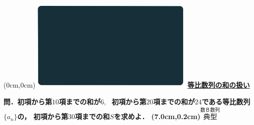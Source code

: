\documentclass[10pt,
fleqn,
dvipdfmx,
uplatex
]{jsarticle}
\begin{document}
\at(0cm,0cm){\includegraphics[width=8cm,bb=0 0 1920 1080]{./youtube/thumbnails/templates/smart_background/数B数列.jpeg}}
{\color{orange}\bf\boldmath\LARGE\underline{等比数列の和の扱い}}\vspace{0.3zw}

\Large 
\bf\boldmath 問．初項から第${10}$項までの和が$6,\;$
初項から第${20}$項までの和が${24}$である等比数列$\{a_n\}$の，
初項から第${30}$項までの和$S$を求めよ．
\at(7.0cm,0.2cm){\small\color{bradorange}$\overset{\text{数Ｂ数列}}{\text{典型}}$}
\end{document}
